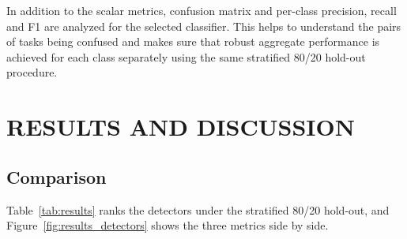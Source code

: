 \documentclass[a4paper,twoside]{article}
\begin{document}
In addition to the scalar metrics, confusion matrix and per-class precision, recall and F1 are analyzed for the selected classifier. This helps to understand the pairs of tasks being confused and makes sure that robust aggregate performance is achieved for each class separately using the same stratified 80/20 hold-out procedure.



\section{\uppercase{Results and Discussion}}\label{sec:results}

\subsection{Comparison}

\noindent Table~\ref{tab:results} ranks the detectors under the stratified 80/20 hold-out, and Figure~\ref{fig:results_detectors} shows the three metrics side by side.
\end{document}
